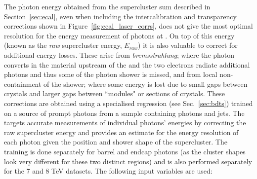 The photon energy obtained from the supercluster sum described in Section~\ref{sec:ecal}, even when including the intercalibration and transparency corrections shown in Figure~\ref{fig:ecal_laser_corrs}, does not give the most optimal resolution for the energy measurement of photons at \CMS. On top of this energy (known as the \emph{raw} supercluster energy, $E_{raw}$) it is also valuable to correct for additional energy losses. These arise from \emph{bremsstrahlung}; where the photon converts in the material upstream of the \ECAL and the two electrons radiate additional photons and thus some of the photon shower is missed, and from local non-containment of the shower; where some energy is lost due to small gaps between \ECAL crystals and larger gaps between ``modules" or sections of crystals. These corrections are obtained using a specialised regression \BDT (see Sec.~\ref{sec:bdts}) trained on a \MC source of prompt photons from a sample containing photons and jets. The \BDT targets accurate measurements of individual photons' energies by correcting the raw supercluster energy and provides an estimate for the energy resolution of each photon given the position and shower shape of the supercluster. The training is done separately for barrel and endcap photons (as the cluster shapes look very different for these two distinct regions) and is also performed separately for the 7 and 8 TeV datasets. The following input variables are used:
